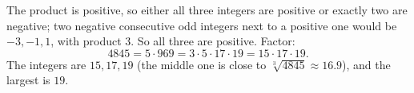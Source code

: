 The product is positive, so either all three integers are positive or exactly two are negative; two negative consecutive odd integers next to a positive one would be $-3,-1,1$, with product $3$. So all three are positive. Factor:
\[
4845=5\cdot969=3\cdot5\cdot17\cdot19=15\cdot17\cdot19 .
\]
The integers are $15,17,19$ (the middle one is close to $\sqrt[3]{4845}\approx16.9$), and the largest is $\boxed{19}$.
